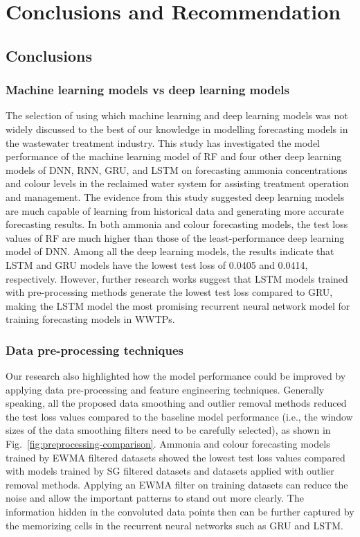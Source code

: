 \chapter{Conclusions and Recommendation}
\section{Conclusions}
\subsection{Machine learning models vs deep learning models}
The selection of using which machine learning and deep learning models was not widely discussed to the best of our knowledge in modelling forecasting models in the wastewater treatment industry. This study has investigated the model performance of the machine learning model of RF and four other deep learning models of DNN, RNN, GRU, and LSTM on forecasting ammonia concentrations and colour levels in the reclaimed water system for assisting treatment operation and management. The evidence from this study suggested deep learning models are much capable of learning from historical data and generating more accurate forecasting results. In both ammonia and colour forecasting models, the test loss values of RF are much higher than those of the least-performance deep learning model of DNN. Among all the deep learning models, the results indicate that LSTM and GRU models have the lowest test loss of 0.0405 and 0.0414, respectively. However, further research works suggest that LSTM models trained with pre-processing methods generate the lowest test loss compared to GRU, making the LSTM model the most promising recurrent neural network model for training forecasting models in WWTPs.

\subsection{Data pre-processing techniques}
Our research also highlighted how the model performance could be improved by applying data pre-processing and feature engineering techniques. Generally speaking, all the proposed data smoothing and outlier removal methods reduced the test loss values compared to the baseline model performance (i.e., the window sizes of the data smoothing filters need to be carefully selected), as shown in Fig.~\ref{fig:preprocessing-comparison}. Ammonia and colour forecasting models trained by EWMA filtered datasets showed the lowest test loss values compared with models trained by SG filtered datasets and datasets applied with outlier removal methods. Applying an EWMA filter on training datasets can reduce the noise and allow the important patterns to stand out more clearly. The information hidden in the convoluted data points then can be further captured by the memorizing cells in the recurrent neural networks such as GRU and LSTM.

